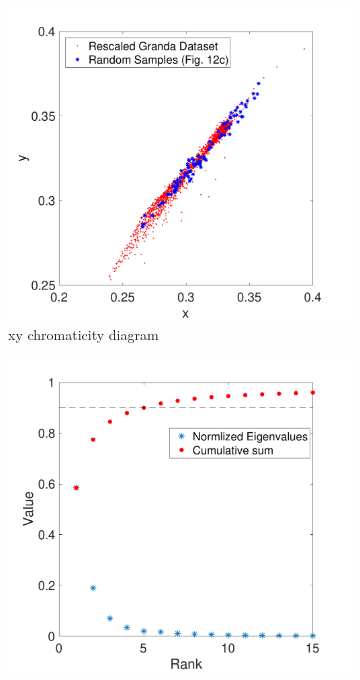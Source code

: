 \documentclass{jov}
\begin{document}
\begin{figure}
	\begin{subfigure}[b]{0.3 \textwidth}
    \centering
        \includegraphics[width=\textwidth]{../Figures/Figure6/Figure6_d.pdf}
        \caption{xy chromaticity diagram}
        \label{fig:xyDiagram}
    \end{subfigure}
	\begin{subfigure}[b]{0.3 \textwidth}
    \centering
        \includegraphics[width=\textwidth]{../Figures/Figure6/Figure6_e.pdf}

\end{subfigure}
\end{figure}
\end{document}

